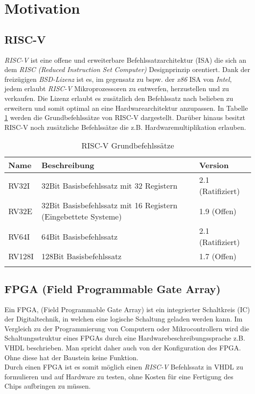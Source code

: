 \section{Motivation}

    \subsection{RISC-V}
        \textit{RISC-V} ist eine offene und erweiterbare Befehlssatzarchitektur (ISA) die sich an dem
        \textit{RISC (Reduced Instruction Set Computer)} Designprinzip orentiert.
        Dank der freizügigen \textit{BSD-Lizenz} ist es, im gegensatz zu bspw. der \textit{x86} ISA von \textit{Intel},
        jedem erlaubt \textit{RISC-V} Mikroprozessoren zu entwerfen, herzustellen und zu verkaufen.
        Die Lizenz erlaubt es zusätzlich den Befehlssatz nach belieben zu erweitern und somit
        optimal an eine Hardwarearchitektur anzupassen.
        In Tabelle \ref{label:riscv-base} werden die Grundbefehlssätze von RISC-V dargestellt.
        Darüber hinaus besitzt RISC-V noch zusätzliche Befehlssätze die z.B. Hardwaremultiplikation erlauben. \cite{riscv-isa-specs}
        
        \begin{center}
            \begin{longtable}{| l | l | l |}
                \hline
                    Name & Beschreibung & Version \\
                \hline
                    RV32I & 32Bit Basisbefehlssatz mit 32 Registern & 2.1 (Ratifiziert)\\
                \hline
                    RV32E & 32Bit Basisbefehlssatz mit 16 Registern (Eingebettete Systeme) & 1.9 (Offen)\\
                \hline
                    RV64I & 64Bit Basisbefehlssatz & 2.1 (Ratifiziert)\\
                \hline
                    RV128I & 128Bit Basisbefehlssatz & 1.7 (Offen)\\
                \hline
                \caption{RISC-V Grundbefehlssätze}
                \label{label:riscv-base}
            \end{longtable}
        \end{center}

    \subsection{FPGA (Field Programmable Gate Array)}
        Ein FPGA, (Field Programmable Gate Array) ist ein integrierter Schaltkreis (IC) der Digitaltechnik,
        in welchen eine logische Schaltung geladen werden kann.
        Im Vergleich zu der Programmierung von Computern oder Mikrocontrollern wird die Schaltungsstruktur eines FPGAs durch eine
        Hardwarebeschreibungssprache z.B. VHDL beschrieben. Man spricht daher auch von der Konfiguration des FPGA.
        Ohne diese hat der Baustein keine Funktion. \cite{fpga-wiki}
        \\
        Durch einen FPGA ist es somit möglich einen \textit{RISC-V} Befehlssatz in VHDL zu formulieren und auf Hardware zu testen,
        ohne Kosten für eine Fertigung des Chips aufbringen zu müssen.

